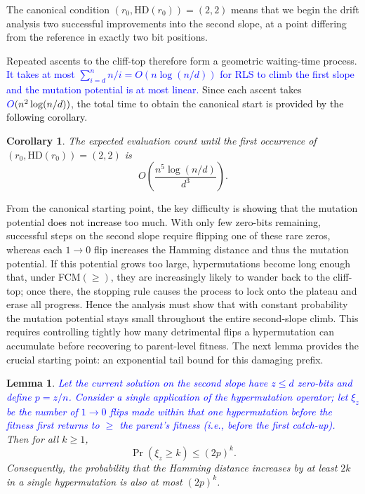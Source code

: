 \documentclass[lettersize,journal]{IEEEtran}
\newcommand{\new}[1]{\textcolor{black}{#1}}
\newcommand{\rev}[1]{\textcolor{blue}{#1}}
\newtheorem{corollary}{Corollary}
\newtheorem{lemma}{Lemma}
\begin{document}
{The canonical condition $(r_0,\mathrm{HD}(r_0)) =
(2,2)$ means that we begin the drift analysis two successful improvements into
the second slope, at a point differing from the reference in exactly two
bit positions.

Repeated ascents to the cliff-top therefore form a geometric waiting-time 
process.   \rev{It takes at most $\sum_{i=d}^{n}n/i=O(n\log(n/d))$ for RLS to climb the first slope and the mutation potential is at most linear.
} Since each ascent takes $\rev{O}(n^2\log(n/d))$, the 
total time to obtain the canonical start is \new{provided by the following corollary}.

\begin{corollary}
The expected evaluation count until the first occurrence of 
	$(r_0,\mathrm{HD}(r_0)) = (2,2)$ is 
	\[
	O\!\left(\frac{n^{5}\log(n/d)}{d^{3}}\right).
	\]
\end{corollary}


From the canonical starting point, the key difficulty is \new{showing that} the mutation
potential \new{does not increase} too much.  With only few zero-bits remaining, successful
steps on the second slope require flipping one of these rare zeros, whereas each
$1\!\to0$ flip increases the Hamming distance and thus the mutation potential.
If this potential grows too large, hypermutations become long enough that, under
FCM$(\ge)$, they are increasingly likely to wander back to the cliff-top; once
there, the stopping rule causes the process to lock onto the plateau and erase
all progress.  Hence the analysis must show that with constant probability the
mutation potential stays small throughout the entire second-slope climb.  This
requires  controlling tightly how many detrimental flips a hypermutation can
accumulate before recovering to parent-level fitness.  The next lemma provides
the crucial starting point: an exponential tail bound for this damaging prefix.

\begin{lemma}\label{lem:xi-tail}
	\textcolor{blue}{Let the current solution on the second slope have $z\le d$ zero-bits and
	define $p=z/n$.
	Consider a single application of the hypermutation operator; let $\xi_z$ be
	the number of $1\to0$ flips made \emph{within that one hypermutation} before
	the fitness first returns to $\ge$ the parent's fitness (i.e., before the
	first catch-up).}
	Then for all $k\ge1$,
	\[
	\Pr(\xi_z\ge k)\le (2p)^k.
	\]
	Consequently, the probability that the Hamming distance increases by at least 
	$2k$ in a single hypermutation is also at most $(2p)^k$.
\end{lemma}

}
\end{document}

